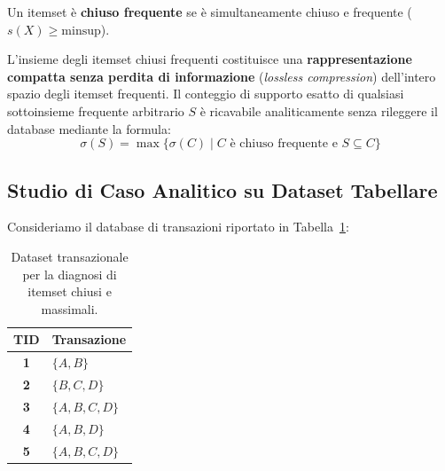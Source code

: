 \begin{definition}
Un itemset è \textbf{chiuso frequente} se è simultaneamente chiuso e frequente ($s(X) \ge \mathrm{minsup}$).
\end{definition}

\begin{theorem}
L'insieme degli itemset chiusi frequenti costituisce una \textbf{rappresentazione compatta senza perdita di informazione} (\textit{lossless compression}) dell'intero spazio degli itemset frequenti. Il conteggio di supporto esatto di qualsiasi sottoinsieme frequente arbitrario $S$ è ricavabile analiticamente senza rileggere il database mediante la formula:
\begin{equation}
\label{eq:dm-support-reconstruction-closed}
\sigma(S) = \max \big\{ \sigma(C) \mid C \text{ è chiuso frequente e } S \subseteq C \big\}
\end{equation}
\end{theorem}

\FloatBarrier
\subsection{Studio di Caso Analitico su Dataset Tabellare}
Consideriamo il database di transazioni riportato in Tabella~\ref{tab:dm-closed-maximal-example}:

\begin{table}[H]
\centering
\small
\renewcommand{\arraystretch}{1.2}
\begin{tabular}{c l}
\toprule
\textbf{TID} & \textbf{Transazione} \\
\midrule
\textbf{1} & $\{A, B\}$ \\
\textbf{2} & $\{B, C, D\}$ \\
\textbf{3} & $\{A, B, C, D\}$ \\
\textbf{4} & $\{A, B, D\}$ \\
\textbf{5} & $\{A, B, C, D\}$ \\
\bottomrule
\end{tabular}
\caption{Dataset transazionale per la diagnosi di itemset chiusi e massimali.}
\label{tab:dm-closed-maximal-example}
\end{table}

